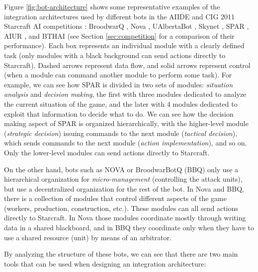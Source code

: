 \documentclass[journal]{IEEEtran}
\begin{document}
Figure \ref{fig:bot-architecture} shows some representative examples of the integration architectures used by different bots in the AIIDE and CIG 2011 Starcraft AI competitions \cite{url1,url2}: BroodwarQ \cite{???}, Nova \cite{???}, UAlbertaBot \cite{???}, Skynet \cite{???}, SPAR \cite{???}, AIUR \cite{???}, and BTHAI \cite{???} (see Section \ref{sec:competition} for a comparison of their performance). Each box represents an individual module with a clearly defined task (only modules with a black background can send actions directly to Starcraft). Dashed arrows represent data flow, and solid arrows represent control (when a module can command another module to perform some task). For example, we can see how SPAR is divided in two sets of modules: {\em situation analysis} and {\em decision making}, the first with three modules dedicated to analyze the current situation of the game, and the later with 4 modules dedicated to exploit that information to decide what to do. We can see how the decision making aspect of SPAR is organized hierarchically, with the higher-level module ({\em strategic decision}) issuing commands to the next module ({\em tactical decision}), which sends commands to the next module ({\em action implementation}), and so on. Only the lower-level modules can send actions directly to Starcraft. 

On the other hand, bots such as NOVA or BroodwarBotQ (BBQ) only use a hierarchical organization for {\em micro-management} (controlling the attack units), but use a decentralized organization for the rest of the bot. In Nova and BBQ, there is a collection of modules that control different aspects of the game (workers, production, construction, etc.). These modules can all send actions directly to Starcraft. In Nova those modules coordinate mostly through writing data in a shared blackboard, and in BBQ they coordinate only when they have to use a shared resource (unit) by means of an arbitrator.

By analyzing the structure of these bots, we can see that there are two main tools that can be used when designing an integration architecture:
\end{document}

